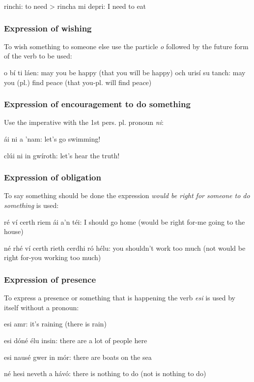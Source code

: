 rinchi: to need
> rincha mi depri: I need to eat

\subsubsection{Expression of wishing}

To wish something to someone else use the particle \textit{o} followed by the future form of the verb to be used:

o b\'{i} ti l\'{a}en: may you be happy (that you will be happy)
och uris\'{i} su tanch: may you (pl.) find peace (that you-pl. will find peace)
 
\subsubsection{Expression of encouragement to do something}

Use the imperative with the 1st pers. pl. pronoun \textit{ni}:
 
\'{a}i ni a 'nam: let's go swimming!

cl\'{u}i ni in gw\'{i}roth: let's hear the truth!

\subsubsection{Expression of obligation}

To say something should be done the expression \textit{would be right for someone to do something} is used:

r\'{e} v\'{i} certh riem \'{a}i a'n t\'{e}i: I should go home (would be right for-me going to the house)

n\'{e} rh\'{e} v\'{i} certh rieth cerdhi r\'{o} h\'{e}lu: you shouldn't work too much (not would be right for-you working too much)

\subsubsection{Expression of presence}

To express a presence or something that is happening the verb \textit{esi} is used by itself without a pronoun:

esi amr: it's raining (there is rain)

esi d\'{o}n\'{e} \'{e}lu insin: there are a lot of people here

esi naus\'{e} gwer in m\'{o}r: there are boats on the sea

n\'{e} hesi neveth a h\'{a}v\'{o}: there is nothing to do (not is nothing to do)
 

